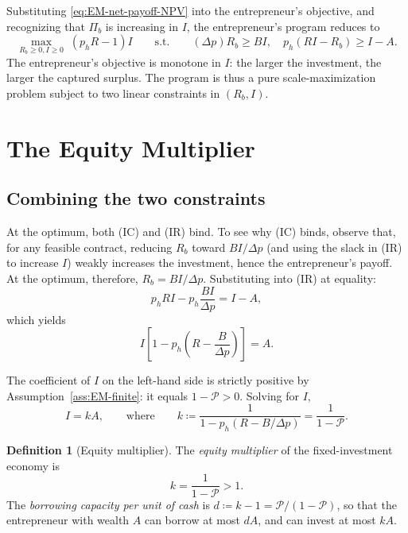 \documentclass[11pt,a4paper,oneside]{book}
\def\geq{\geqslant}
\theoremstyle{plain}
\theoremstyle{definition}
\newtheorem{definition}[theorem]{Definition}
\theoremstyle{remark}
\numberwithin{equation}{chapter}
\begin{document}
Substituting \eqref{eq:EM-net-payoff-NPV} into the entrepreneur's objective, and recognizing that $\Pi_b$ is increasing in $I$, the entrepreneur's program reduces to
\begin{equation*}
  \max_{R_b \geq 0, I \geq 0} \; (p_h R - 1) I
  \qquad \text{s.t.} \qquad
  (\Delta p) R_b \geq B I, \quad
  p_h (R I - R_b) \geq I - A.
\end{equation*}
The entrepreneur's objective is monotone in $I$: the larger the investment, the larger the captured surplus.
The program is thus a pure scale-maximization problem subject to two linear constraints in $(R_b, I)$.

\section{The Equity Multiplier}
\label{sec:EM-multiplier}

\subsection{Combining the two constraints}

At the optimum, both (IC) and (IR) bind.
To see why (IC) binds, observe that, for any feasible contract, reducing $R_b$ toward $B I / \Delta p$ (and using the slack in (IR) to increase $I$) weakly increases the investment, hence the entrepreneur's payoff.
At the optimum, therefore, $R_b = B I / \Delta p$.
Substituting into (IR) at equality:
\begin{equation*}
  p_h R I - p_h \frac{B I}{\Delta p} = I - A,
\end{equation*}
which yields
\begin{equation}\label{eq:EM-I-A-relation}
  I \left[ 1 - p_h \left( R - \frac{B}{\Delta p} \right) \right] = A.
\end{equation}

The coefficient of $I$ on the left-hand side is strictly positive by Assumption~\ref{ass:EM-finite}: it equals $1 - \mathcal{P} > 0$.
Solving for $I$,
\begin{equation}\label{eq:EM-I-kA}
  I = k A, \qquad \text{where} \qquad k \coloneqq \frac{1}{1 - p_h(R - B/\Delta p)} = \frac{1}{1 - \mathcal{P}}.
\end{equation}

\begin{definition}[Equity multiplier]\label{def:EM}
The \emph{equity multiplier} of the fixed-investment economy is
\begin{equation}\label{eq:EM-k-def}
  k = \frac{1}{1 - \mathcal{P}} > 1.
\end{equation}
The \emph{borrowing capacity per unit of cash} is $d \coloneqq k - 1 = \mathcal{P}/(1 - \mathcal{P})$, so that the entrepreneur with wealth $A$ can borrow at most $d A$, and can invest at most $k A$.
\end{definition}
\end{document}
